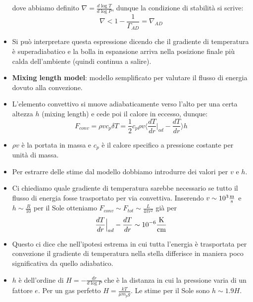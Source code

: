 \documentclass[11pt,a4paper]{article}
\begin{document}
\begin{itemize}
dove abbiamo definito $\nabla = \frac{d \log T}{d \log P}$, dunque la condizione di stabilità si scrive:
\begin{equation}
\nabla < 1 - \frac{1}{\Gamma_{AD}} = \nabla_{AD}
\end{equation}

\item Si può interpretare questa espressione dicendo che il gradiente di temperatura è superadiabatico e la bolla in espansione arriva nella posizione finale più calda dell'ambiente (quindi continua a salire).

\item \textbf{Mixing length model}: modello semplificato per valutare il flusso di energia dovuto alla convezione.

\item L'elemento convettivo si muove adiabaticamente verso l'alto per una certa altezza $h$ (mixing length) e cede poi il calore in eccesso, dunque:
\begin{equation}
F_{conv} =  \rho v c_p \delta T = \frac{1}{2} c_p \rho v \Big \langle \frac{dT}{dr} \Big | _ {ad} - \frac{dT}{dr} \Big \rangle h
\end{equation}

\item $\rho v $ è la portata in massa e $c_p$ è il calore specifico a pressione costante per unità di massa.

\item Per estrarre delle stime dal modello dobbiamo introdurre dei valori per $v$ e $h$.

\item Ci chiediamo quale gradiente di temperatura sarebbe necessario se tutto il flusso di energia fosse trasportato per via convettiva. Inserendo $v \sim 10^3 \si{\frac{\meter}{\second}}$ e $h \sim \frac{R}{10}$ per il Sole otteniamo $F_{conv} \sim F_{tot} \sim \frac{L}{4 \pi r^2}$ già per
\begin{equation}
\frac{dT}{dr} \Big | _ {ad} - \frac{dT}{dr} \sim 10^{-6} \si{\frac{\kelvin}{\cm}}
\end{equation}

\item Questo ci dice che nell'ipotesi estrema in cui tutta l'energia è trasportata per convezione il gradiente di temperatura nella stella differisce in maniera poco significativa da quello adiabatico.

\item $h$ è dell'ordine di $H = -\frac{d r}{d \log P}$ che è la distanza in cui la pressione varia di un fattore $e$. Per un gas perfetto $H = \frac{kT}{\mu m_p g}$. Le stime per il Sole sono $h \sim 1.9 H$.


\end{itemize}
\end{document}
